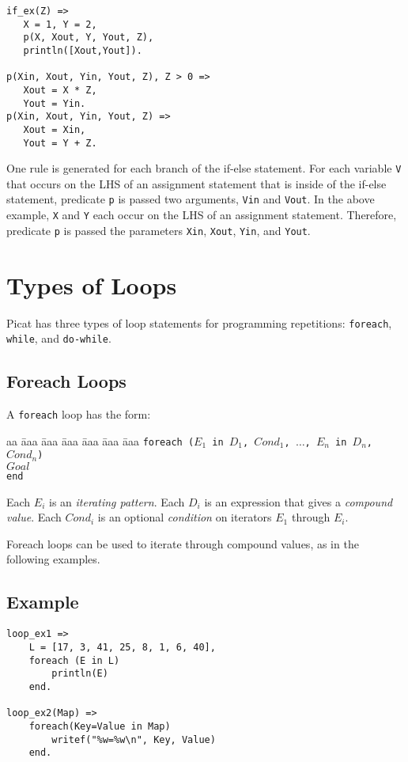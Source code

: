\begin{verbatim}
if_ex(Z) => 
   X = 1, Y = 2, 
   p(X, Xout, Y, Yout, Z),
   println([Xout,Yout]).

p(Xin, Xout, Yin, Yout, Z), Z > 0 =>
   Xout = X * Z,
   Yout = Yin.
p(Xin, Xout, Yin, Yout, Z) =>
   Xout = Xin,
   Yout = Y + Z.
\end{verbatim}
One rule is generated for each branch of the if-else statement.  For each variable \texttt{V} that occurs on the LHS of an assignment statement that is inside of the if-else statement, predicate \texttt{p} is passed two arguments, \texttt{Vin} and \texttt{Vout}.  In the above example, \texttt{X} and \texttt{Y} each occur on the LHS of an assignment statement.  Therefore, predicate \texttt{p} is passed the parameters \texttt{Xin}, \texttt{Xout}, \texttt{Yin}, and \texttt{Yout}. 

\section{Types of Loops}
Picat has three types of loop statements for programming repetitions: \texttt{foreach}, \texttt{while}, and \texttt{do-while}.

\subsection{Foreach Loops}
A \texttt{foreach} loop has the form:
\begin{tabbing}
aa \= aaa \= aaa \= aaa \= aaa \= aaa \= aaa \kill
\> \texttt{foreach ($E_1$ in $D_1$, $Cond_1$, $\ldots$, $E_n$ in $D_n$, $Cond_n$)}  \\
\> \> $Goal$ \\
\>  \texttt{end} 
\end{tabbing}
Each $E_i$ is an \emph{iterating pattern}.  Each $D_i$ is an expression that gives a \emph{compound value}.  Each $Cond_i$ is an optional \emph{condition} on iterators $E_1$ through $E_i$. 

Foreach loops can be used to iterate through compound values, as in the following examples.

\subsection*{Example}
\begin{verbatim}
loop_ex1 =>
    L = [17, 3, 41, 25, 8, 1, 6, 40],
    foreach (E in L)
        println(E)
    end.

loop_ex2(Map) =>
    foreach(Key=Value in Map)
        writef("%w=%w\n", Key, Value)
    end.
\end{verbatim}


